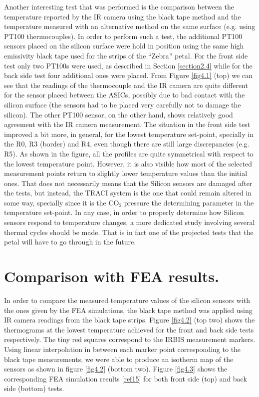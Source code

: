 		Another interesting test that was performed is the comparison between the temperature reported by the IR camera using the black tape method and the temperature measured with an alternative method on the same surface (e.g. using PT100 thermocouples). In order to perform such a test, the additional PT100 sensors placed on the silicon surface were hold in position using the same high emissivity black tape used for the strips of the “Zebra” petal. For the front side test only two PT100s were used, as described in Section \ref{section2.4} while for the back side test four additional ones were placed. From Figure \ref{fig4.1} (top) we can see that the readings of the thermocouple and the IR camera are quite different for the sensor placed between the ASICs, possibly due to bad contact with the silicon surface (the sensors had to be placed very carefully not to damage the silicon). The other PT100 sensor, on the other hand, shows relatively good agreement with the IR camera measurement. The situation in the front side test improved a bit more, in general, for the lowest temperature set-point, specially in the R0, R3 (border) and R4, even though there are still large discrepancies (e.g. R5). As shown in the figure, all the profiles are quite symmetrical with respect to the lowest temperature point. However, it is also visible how most of the selected measurement points return to slightly lower temperature values than the initial ones. That does not necessarily means that the Silicon sensors are damaged after the tests, but instead, the TRACI system is the one that could remain altered in some way, specially since it is the CO$_{2}$ pressure the determining parameter in the temperature set-point.
		In any case, in order to properly determine how Silicon sensors respond to temperature changes, a more dedicated study involving several thermal cycles should be made. That is in fact one of the projected tests that the petal will have to go through in the future.\bigskip
		
	\section{Comparison with FEA results.}\label{section4.2}	
	
		In order to compare the measured temperature values of the silicon sensors with the ones given by the FEA simulations, the black tape method was applied using IR camera readings from the black tape strips. Figure \ref{fig4.2} (top two) shows the thermograms at the lowest temperature achieved for the front and back side tests respectively. The tiny red squares correspond to the IRBIS measurement markers. Using linear interpolation in between each marker point corresponding to the black tape measurements, we were able to produce an isotherm map of the sensors as shown in figure \ref{fig4.2} (bottom two). Figure \ref{fig4.3} shows the corresponding FEA simulation results \ref{ref15} for both front side (top) and back side (bottom) tests.
		
